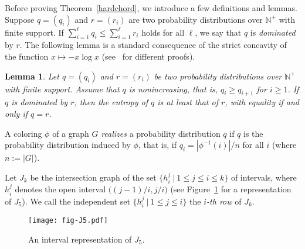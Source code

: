 \documentclass[10pt,a4paper]{article}
\newtheorem{lemma}{Lemma}
\begin{document}
Before proving Theorem~\ref{hardchord}, 
we introduce a few definitions and lemmas. 
Suppose $q=(q_i)$ and $r=(r_i)$ are two probability distributions
over $\mathbb{N}^+$ with finite support. If $\sum_{i=1}^\ell q_i \le \sum_{i=1}^\ell r_i$
holds for all $\ell$, we say that $q$ is {\em dominated} by $r$.
The following lemma is a standard consequence of the strict
concavity of the function $x \mapsto -x\log x$
(see~\cite{FHN-soda, HLP88} for different proofs).

\begin{lemma}
\label{lem-jungle}
Let $q=(q_i)$ and $r=(r_i)$ be two probability distributions 
over $\mathbb{N}^+$ with finite support. Assume that $q$ is 
nonincreasing, that is, $q_i \ge q_{i+1}$ for $i\ge 1$. If 
$q$ is dominated by $r$, then the entropy of $q$ is at least that of $r$, with
equality if and only if $q=r$.
\end{lemma}

A coloring $\phi$ of a graph $G$ {\em realizes} a probability distribution
$q$ if $q$ is the probability distribution induced by $\phi$, that is, 
if $q_{i} = |\phi^{-1}(i)|/n$ for all $i$ (where $n:=|G|$).

Let $J_k$ be the intersection 
graph of the set $\{h_i^j\ |\ 1 \le j \le i \le k\}$ of intervals, 
where $h_i^j$ denotes the open interval $\big((j-1)/i, j/i\big)$ 
(see Figure~\ref{fig-J5} for a representation of $J_5$).
We call the independent set $\{h_i^j\ |\ 1 \le j \le i\}$ 
the {\em $i$-th row} of $J_k$. 

\begin{figure}
\centering
\texttt{[image: fig-J5.pdf]} 
\caption{\label{fig-J5}An interval representation of $J_{5}$.}
\end{figure}
\end{document}
